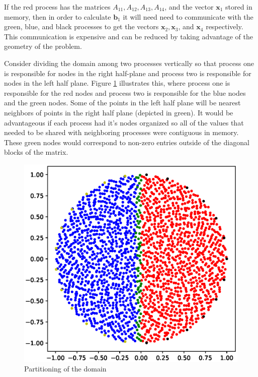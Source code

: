 \documentclass[12pt]{article}
\let\vec\mathbf
\begin{document}




If the red process has the matrices $A_{11}, A_{12}, A_{13}, A_{14}$, and the vector $\vec{x}_1$ stored in memory, then in order to calculate $\vec{b}_1$ it will need need to communicate with the green, blue, and black processes to get the vectors $\vec{x}_2, \vec{x}_3$, and $\vec{x}_4$ respectively. This communication is expensive and can be reduced by taking advantage of the geometry of the problem.

Consider dividing the domain among two processes vertically so that process one is responsible for nodes in the right half-plane and process two is responsible for nodes in the left half plane. Figure \ref{dsik_two_proc} illustrates this, where process one is responsible for the red nodes and process two is responsible for the blue nodes and the green nodes. Some of the points in the left half plane will be nearest neighbors of points in the right half plane (depicted in green). It would be advantageous if each process had it's nodes organized so all of the values that needed to be shared with neighboring processes were contiguous in memory. These green nodes would correspond to non-zero entries outside of the diagonal blocks of the matrix.

\begin{figure}[ht]
	\centering
	\includegraphics[width=.75\textwidth]{nearest_2proc_disk.eps}
	\caption{Partitioning of the domain }
	\label{dsik_two_proc}
\end{figure}
\end{document}

